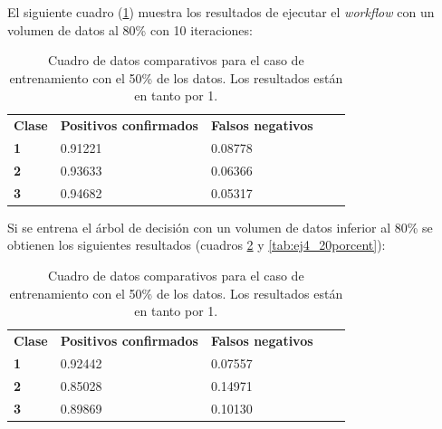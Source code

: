 \documentclass[10pt,a4paper]{article}
\begin{document}
El siguiente cuadro (\ref{tab:ej4_80porcent}) muestra los resultados de ejecutar el \emph{workflow} con un volumen de datos al 80\%{} con 10 iteraciones:

\begin{table}[h!]
\centering
\begin{tabular}{|l|l|l|ll}
\cline{1-3}
\multicolumn{1}{|c|}{\textbf{Clase}} & \multicolumn{1}{c|}{\textbf{Positivos confirmados}} & \multicolumn{1}{c|}{\textbf{Falsos negativos}} & \multicolumn{1}{c}{\textbf{}} &  \\ \cline{1-3}
\textbf{1}                       &         0.91221                       &       0.08778                         &                               &  \\ \cline{1-3}
\textbf{2}                       &         0.93633                       &       0.06366                         &                               &  \\ \cline{1-3}
\textbf{3}                       &         0.94682                       &       0.05317                         &                               &  \\ \cline{1-3}
\end{tabular}
\caption{Cuadro de datos comparativos para el caso de entrenamiento con el 50\%{} de los datos. Los resultados están en tanto por 1.}
\label{tab:ej4_80porcent}
\end{table}

Si se entrena el árbol de decisión con un volumen de datos inferior al 80\%{} se obtienen los siguientes resultados (cuadros \ref{tab:ej4_50porcent} y \ref{tab:ej4_20porcent}):

\begin{table}[h!]
\centering
\begin{tabular}{|l|l|l|ll}
\cline{1-3}
\multicolumn{1}{|c|}{\textbf{Clase}} & \multicolumn{1}{c|}{\textbf{Positivos confirmados}} & \multicolumn{1}{c|}{\textbf{Falsos negativos}} & \multicolumn{1}{c}{\textbf{}} &  \\ \cline{1-3}
\textbf{1}                       &         0.92442                       &       0.07557                         &                               &  \\ \cline{1-3}
\textbf{2}                       &         0.85028                       &       0.14971                         &                               &  \\ \cline{1-3}
\textbf{3}                       &         0.89869                       &       0.10130                         &                               &  \\ \cline{1-3}
\end{tabular}
\caption{Cuadro de datos comparativos para el caso de entrenamiento con el 50\%{} de los datos. Los resultados están en tanto por 1.}
\label{tab:ej4_50porcent}
\end{table}
\end{document}
